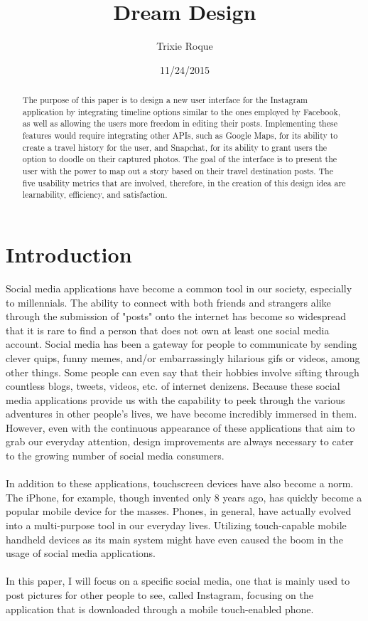 \documentclass[11pt]{article}
\title{Dream Design}
\author{Trixie Roque}
\date{11/24/2015}
\begin{document}
\maketitle

\begin{abstract}
The purpose of this paper is to design a new user interface for the Instagram application by integrating timeline options similar to the ones employed by Facebook, as well as allowing the users more freedom in editing their posts. Implementing these features would require integrating other APIs, such as Google Maps, for its ability to create a travel history for the user, and Snapchat, for its ability to grant users the option to doodle on their captured photos. The goal of the interface is to present the user with the power to map out a story based on their travel destination posts. The five usability metrics that are involved, therefore, in the creation of this design idea are learnability, efficiency, and satisfaction.
\end{abstract}

\pagebreak
\tableofcontents

\pagebreak

\section{Introduction}
\label{Introduction}
   \indent 
    \indent Social media applications have become a common tool in our society, especially to millennials. The ability to connect with both friends and strangers alike through the submission of "posts" onto the internet has become so widespread that it is rare to find a person that does not own at least one social media account. Social media has been a gateway for people to communicate by sending clever quips, funny memes, and/or embarrassingly hilarious gifs or videos, among other things. Some people can even say that their hobbies involve sifting through countless blogs, tweets, videos, etc. of internet denizens. Because these social media applications provide us with the capability to peek through the various adventures in other people's lives, we have become incredibly immersed in them. However, even with the continuous appearance of these applications that aim to grab our everyday attention, design improvements are always necessary to cater to the growing number of social media consumers. \\ \\
     \indent In addition to these applications, touchscreen devices have also become a norm. The iPhone, for example, though invented only 8 years ago, has quickly become a popular mobile device for the masses. Phones, in general, have actually evolved into a multi-purpose tool in our everyday lives. Utilizing touch-capable mobile handheld devices as its main system might have even caused the boom in the usage of social media applications. \\ \\
     \indent In this paper, I will focus on a specific social media, one that is mainly used to post pictures for other people to see, called Instagram, focusing on the application that is downloaded through a mobile touch-enabled phone.
     
\end{document}
